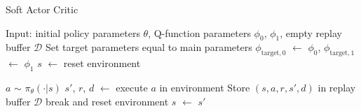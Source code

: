 \begin{algorithm}
	\caption{Soft Actor Critic}\label{alg:SAC}
	\begin{algorithmic}
		\State{} Input: initial policy parameters $\theta$, Q-function parameters $\phi_0$, $\phi_1$, empty replay buffer $\mathcal{D}$
			\State{} Set target parameters equal to main parameters $\phi_{\text{target}, 0}$ $\leftarrow$ $\phi_0$, $\phi_{\text{target}, 1}$ $\leftarrow$ $\phi_1$ 
			\State{} $s$ $\leftarrow$ reset environment
			
			\State{} $a$ $\sim$ $\pi_\theta(\cdot | s)$
			\State{} $s'$, $r$, $d$ $\leftarrow$ execute $a$ in environment
			\State{} Store $(s, a, r, s', d)$ in replay buffer $\mathcal{D}$
			\State{} break and reset environment
			\EndIf{}
			\State{} $s$ $\leftarrow$ $s'$
			\EndFor{}
			

\end{algorithmic}
\end{algorithm}
